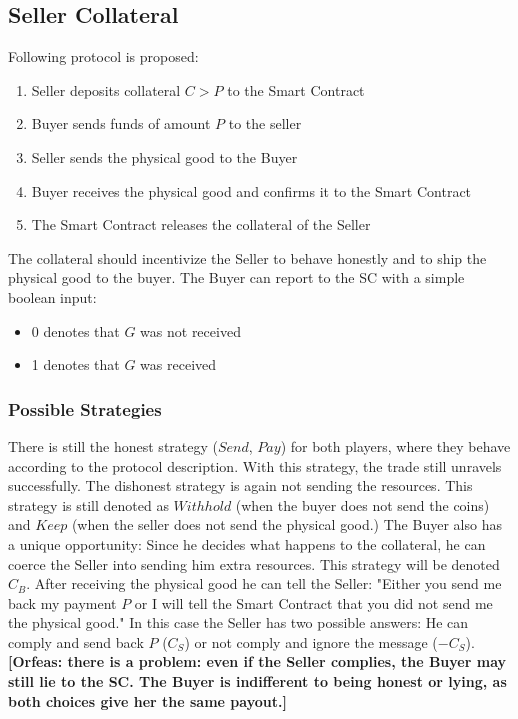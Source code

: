 \documentclass{cacthesis}
\newcommand{\authnote}[3]{{ \footnotesize \textbf{#1[#2: #3]~}}}
\newcommand{\orfnote}[1]{\authnote{\color{blue}}{Orfeas}{#1}}
\begin{document}
\subsection{Seller Collateral}
Following protocol is proposed:
\begin{enumerate}
    \item Seller deposits collateral $C > P$ to the Smart Contract
    \item Buyer sends funds of amount $P$ to the seller 
    \item Seller sends the physical good to the Buyer
    \item Buyer receives the physical good and confirms it to the Smart Contract
    \item The Smart Contract releases the collateral of the Seller
\end{enumerate}
The collateral should incentivize the Seller to behave honestly and to ship the
physical good to the buyer. The Buyer can report to the SC with a simple boolean input:
\begin{itemize}
    \item 0 denotes that $G$ was not received
    \item 1 denotes that $G$ was received
\end{itemize}
\subsubsection{Possible Strategies}
There is still the honest strategy ($Send$, $Pay$) for both players, where they behave according to the protocol description. With this strategy, the trade still unravels successfully.\newline
The dishonest strategy is again not sending the resources. This strategy is
still denoted as $Withhold$ (when the buyer does not send the coins) and $Keep$
(when the seller does not send the physical good.)\newline
The Buyer also has a unique opportunity: Since he decides what happens to the
collateral, he can coerce the Seller into sending him extra resources. This
strategy will be denoted $C_B$.  After receiving the physical good he can tell
the Seller: "Either you send me back my payment $P$ or I will tell the Smart
Contract that you did not send me the physical good." In this case the Seller
has two possible answers: He can comply and send back $P$ ($C_S$) or not comply
and ignore the message ($-C_S$). \orfnote{there is a problem: even if the Seller
complies, the Buyer may still lie to the SC. The Buyer is indifferent to being
honest or lying, as both choices give her the same payout.}\newline
\end{document}
